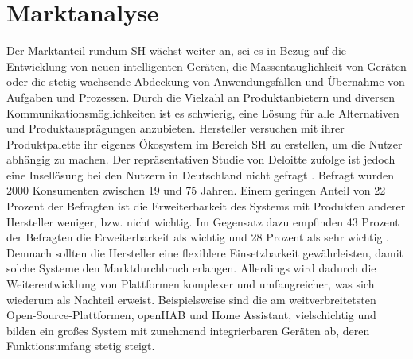 \section{Marktanalyse}
\label{sec:marktanalyse}
    Der Marktanteil rundum \acl{SH} wächst weiter an, %
    sei es in Bezug auf die Entwicklung von neuen intelligenten Geräten, die 
    Massentauglichkeit von Geräten 
    oder die stetig wachsende Abdeckung von Anwendungsfällen und Übernahme von Aufgaben und Prozessen. Durch die Vielzahl an 
    Produktanbietern und diversen Kommunikationsmöglichkeiten ist es schwierig, eine Lösung für alle Alternativen und 
    Produktausprägungen anzubieten. Hersteller versuchen mit ihrer Produktpalette ihr eigenes Ökosystem im Bereich 
    \acl{SH} zu erstellen, um die Nutzer abhängig zu machen. Der repräsentativen Studie von Deloitte zufolge ist jedoch eine 
    Insellösung bei den Nutzern in Deutschland nicht gefragt \cite{deloitte2018}. Befragt wurden 2000 Konsumenten zwischen 
    19 und 75 Jahren. Einem geringen Anteil von 22 Prozent der 
    Befragten ist die Erweiterbarkeit des Systems mit Produkten anderer Hersteller weniger, bzw. nicht wichtig. Im Gegensatz dazu 
    empfinden 43 Prozent der Befragten die Erweiterbarkeit als wichtig und 28 Prozent als sehr wichtig \cite{deloitte2018}. 
    Demnach sollten die Hersteller eine flexiblere Einsetzbarkeit gewährleisten, damit solche Systeme den Marktdurchbruch 
    erlangen. Allerdings wird dadurch die Weiterentwicklung von Plattformen komplexer und umfangreicher, was sich wiederum als 
    Nachteil erweist. Beispielsweise sind die am weitverbreitetsten Open-Source-Plattformen, openHAB und Home Assistant, 
    vielschichtig und bilden ein großes System mit zunehmend integrierbaren Geräten ab, deren Funktionsumfang stetig steigt. 

